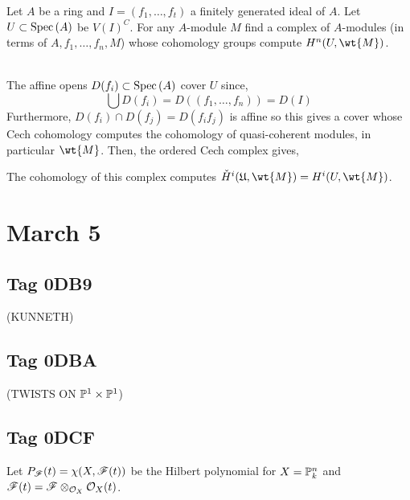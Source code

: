 \documentclass[12pt]{article}
\begin{document}
\begin{exr}
Let $A$ be a ring and $I = (f_1, \dots, f_t)$ a finitely generated ideal of $A$. Let $U \subset \Spec{A}$ be $V(I)^C$. For any $A$-module $M$ find a complex of $A$-modules (in terms of $A, f_1, \dots, f_n, M$) whose cohomology groups compute $H^n(U, \wt{M})$. 
\end{exr}
\noindent\\
The affine opens $D(f_i) \subset \Spec{A}$ cover $U$ since,
\[ \bigcup D(f_i) = D((f_1, \dots, f_n)) = D(I) \]
Furthermore, $D(f_i) \cap D(f_j) = D(f_i f_j)$ is affine so this gives a cover whose Cech cohomology computes the cohomology of quasi-coherent modules, in particular $\wt{M}$. Then, the ordered Cech complex gives,
\begin{center}
\end{center}
The cohomology of this complex computes $\check{H}^i(\mathfrak{U}, \wt{M}) = H^i(U, \wt{M})$. 

\section{March 5}

\subsection{Tag 0DB9}
(KUNNETH)

\subsection{Tag 0DBA}
(TWISTS ON $\P^1 \times \P^1$)

\subsection{Tag 0DCF}

Let $P_\F(t) = \chi(X, \F(t))$ be the Hilbert polynomial for $X = \P^n_k$ and $\F(t) = \F \otimes_{\struct{X}} \struct{X}(t)$. 
\end{document}
